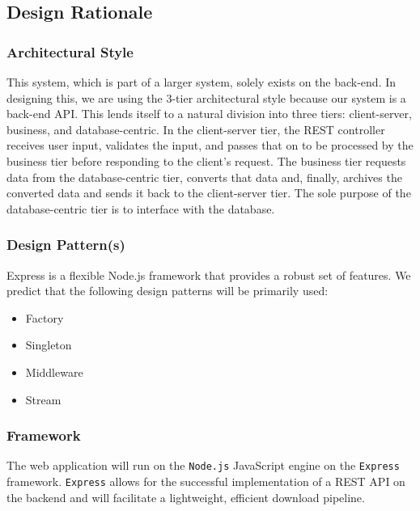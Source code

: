 \documentclass{article}
\begin{document}
	\subsection{Design Rationale}
	
	\subsubsection{Architectural Style}
	
	This system, which is part of a larger system, solely exists on the back-end. In designing this, we are using the 3-tier architectural style because our system is a back-end API. This lends itself to a natural division into three tiers: client-server, business, and database-centric. In the client-server tier, the REST controller receives user input, validates the input, and passes that on to be processed by the business tier before responding to the client's request. The business tier requests data from the database-centric tier, converts that data and, finally, archives the converted data and sends it back to the client-server tier. The sole purpose of the database-centric tier is to interface with the database. 
	
	\subsubsection{Design Pattern(s)}
	
	Express is a flexible Node.js framework that provides a robust set of features. We predict that the following design patterns will be primarily used: \\
	
	\begin{itemize} 
		\item Factory
		\item Singleton
		\item Middleware
		\item Stream
	\end{itemize}
	
	
	\subsubsection{Framework}
	
	The web application will run on the \texttt{Node.js} JavaScript engine on the \texttt{Express} framework. \texttt{Express} allows for the successful implementation of a REST API on the backend and will facilitate a lightweight, efficient download pipeline. \\
	
\end{document}
